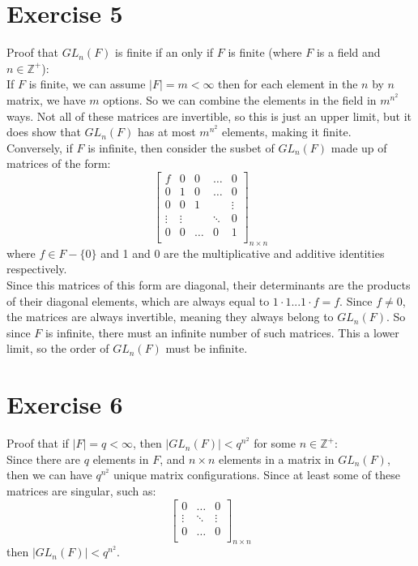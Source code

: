 \documentclass[12pt]{article}
\newcommand{\Z}{\mathbb{Z}}
\begin{document}
    \section*{Exercise 5}
    Proof that $GL_n(F)$ is finite if an only if $F$ is finite
    (where $F$ is a field and $n \in \Z^+$): \\
    If $F$ is finite, we can assume $|F| = m < \infty$
    then for each element in the $n$ by $n$ matrix, we have $m$ options.
    So we can combine the elements in the field in $m^{n^2}$ ways.
    Not all of these matrices are invertible,
    so this is just an upper limit,
    but it does show that $GL_n(F)$ has at most $m^{n^2}$ elements,
    making it finite. \\
    Conversely, if $F$ is infinite,
    then consider the susbet of $GL_n(F)$ made up of matrices of the form:
    \[\begin{bmatrix}
    f & 0 & 0 & \dots & 0\\
    0 & 1 & 0 & \dots & 0 \\
    0 & 0 & 1 & & \vdots \\
    \vdots & \vdots & & \ddots & 0\\ 
    0 & 0 & \dots & 0 & 1 \\
    \end{bmatrix}_{n \times n}\]
    where $f \in F - \{0\}$ and 1 and 0 are the multiplicative and
    additive identities respectively. \\
    Since this matrices of this form are diagonal,
    their determinants are the products of their diagonal elements,
    which are always equal to $1 \cdot 1 ... 1 \cdot f = f$.
    Since $f \neq 0$, the matrices are always invertible, meaning
    they always belong to $GL_n(F)$.
    So since $F$ is infinite, there must an infinite number of
    such matrices.
    This a lower limit, so the order of $GL_n(F)$ must be infinite.


    \section*{Exercise 6}
    Proof that if $|F| = q < \infty$,
    then $|GL_n(F)| < q^{n^2}$ for some $n \in \Z^+$: \\
    Since there are $q$ elements in $F$,
    and $n \times n$ elements in a matrix in $GL_n(F)$, 
    then we can have $q^{n^2}$ unique matrix configurations.
    Since at least some of these matrices are singular, such as:
    \[\begin{bmatrix}
    0 & \dots & 0\\
    \vdots & \ddots & \vdots \\ 
    0 & \dots & 0 \\
    \end{bmatrix}_{n \times n}\]
    then $|GL_n(F)| < q^{n^2}$.
\end{document}
